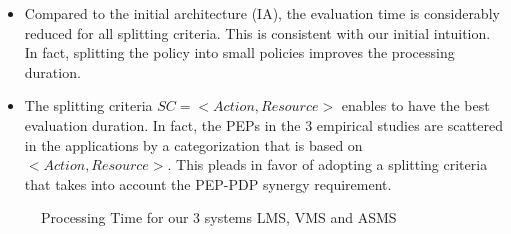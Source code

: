 \begin{itemize} 
\item Compared to the initial architecture (IA), the evaluation time is considerably reduced for all splitting criteria. This is consistent with our 
initial intuition. In fact, splitting the policy into small policies improves the processing duration.
\item The splitting criteria \normalsize $SC=< Action, Resource>$ enables to have the best evaluation duration. 
In fact, the PEPs in the 3 empirical studies are scattered in the applications by a categorization
 that is based on $<Action, Resource>$. This pleads in favor of adopting a
 splitting criteria that takes into account the PEP-PDP synergy requirement.
\end{itemize} 
\begin{figure}
  \centering
  \caption{Processing Time for our 3 systems LMS, VMS and ASMS}
  \label{fig:processing time}
\end{figure}
